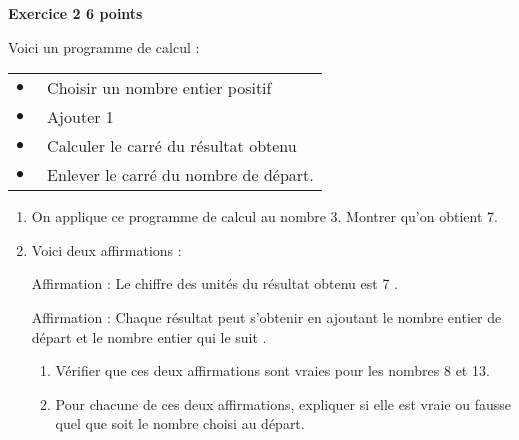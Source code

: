 \textbf{Exercice 2 \hfill 6 points}

\medskip

Voici un programme de calcul : 
\begin{center}
\begin{tabularx}{0.45\linewidth}{|l X|}\hline
$\bullet~~$& Choisir un nombre entier positif\\
$\bullet~~$& Ajouter 1\\
$\bullet~~$& Calculer le carré du résultat obtenu\\
$\bullet~~$& Enlever le carré du nombre de départ.\\ \hline
\end{tabularx}
\end{center}

\begin{enumerate}
\item On applique ce programme de calcul au nombre 3. Montrer qu'on obtient 7.
\item Voici deux affirmations :

Affirmation  : \og Le chiffre des unités du résultat obtenu est 7 \fg.

Affirmation  : \og Chaque résultat peut s'obtenir en ajoutant le nombre entier de départ et le nombre entier qui le suit \fg.
	\begin{enumerate}
		\item Vérifier que ces deux affirmations sont vraies pour les nombres 8 et 13.
		\item Pour chacune de ces deux affirmations, expliquer si elle est vraie ou fausse quel que soit le nombre choisi au départ.
	\end{enumerate}
\end{enumerate}

\bigskip


\bigskip

